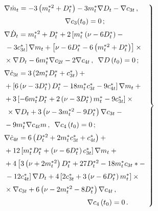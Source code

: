 \begin{multicols}{2}
\noindent
    \begin{equation}
    \left.
    \begin{array}{l}
    \hspace*{-1mm}\nabla\dot m_t = -3\left( m_t^{*2} +  D_t^*\right) -
    3 m_t^* \nabla D_t -\nabla c_{3t}\,,\\[6pt]
    \hspace*{29mm}\nabla c_3 (t_0) =0\,;\\[6pt]
        \hspace*{-1mm}\nabla \dot D_t = m_t^{*2} + D_t^*+ 2 \left[ m_t^* \left(\nu - 6 D_t^*\right) -{}\right.\\[6pt]
\left.    \hspace*{-1mm}{}-    3 c_{3t}^*\right] \nabla m_t + 
\left[ \nu - 6 D^*_t - 6 \left( m_t^{*2} + D_t^*\right) \right]\times{}\\[6pt]
    \hspace*{-1mm}{}\times \nabla D_t -
6 m_t^* \nabla c_{2t} - 2 \nabla c_{4t}\,,\enskip
\nabla D \left(t_0\right) =0\,;
\\[6pt]
        \hspace*{-1mm}\nabla \dot c_{3t} = 3\left( 2 m_t^* D_t^* + c_{3t}^*\right) +{}\\[6pt]
        \hspace*{-1mm}{}+
    \left[ 6 \left(\nu - 3 D_t^*\right) D_t^* - 18 m_t^* c_{3t}^* - 9 c_{4t}^* \right]
     \nabla m_t+{}\\[6pt]
    \hspace*{-1mm}{}+ 3 \left[ - 6 m_t^* D_t^* + 2 \left(\nu - 3 D_t^*\right) m_t^* -
9 c_{3t}^*\right]\times{}\\[6pt]
{}\times\nabla D_t+ 3 \left(\nu - 3 m_t^{*2} - 9 D_t^*\right) \nabla c_{3t} -{}\\[6pt]
    \hspace*{-1mm}{}-9 m_t^* \nabla c_{4t}m\,,\enskip
\nabla c_4 \left(t_0\right) =0\,;
\\[6pt]
        \hspace*{-1mm}\nabla \dot c_{4t} = 6 \left( D_t^{*2} + 2 m_t^* c_{3t}^* + c_{4t}^*\right) +{}\\[6pt]
        \hspace*{-1mm}{}+
    12 \left[ m_t^* D_t^* + \left(\nu - 6 D_t^*\right) c_{3t}^* \right] \nabla m_t+{}\\[6pt]
    \hspace*{-1mm}{}+4 \left[ 3 \left(\nu + 2 m_t^{*2} \right) D_t^* + 27 D_t^{*2} - 18 m_t^* c_{3t}* -{}\right.\\[6pt]
\left.    \hspace*{-1mm}{}-
12 c_{4t}^* \right] \nabla D_t + 4 \left[
2 c_{3t}^* + 3 \left(\nu - 6 D_t^*\right) m_t^* \right]\times{}\\[6pt]
    \hspace*{-1mm}{}\times \nabla c_{3t} +6 \left(\nu - 2 m_t^{*2} - 8 D_t^*\right) \nabla c_{4t}\,,\\[6pt]
\hspace*{40mm}\nabla c_4 \left(t_0\right) =0\,.
\end{array}\!
\right\}\!\!\!
\label{e26-sin}
\end{equation}


\end{multicols}
